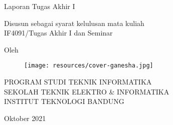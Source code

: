 \clearpage
\pagestyle{empty}

\begin{center}
    \smallskip
    
    \Large \bfseries \MakeUppercase{\thetitle}
    \vfill
    
    \Large Laporan Tugas Akhir I
    \vfill
    
    \large Disusun sebagai syarat kelulusan mata kuliah \\
    IF4091/Tugas Akhir I dan Seminar
    \vfill
    
    \large Oleh
    
    \Large \theauthor
    
    \vfill
    \begin{figure}[h]
        \centering
        \texttt{[image: resources/cover-ganesha.jpg]}
    \end{figure}
    \vfill
    
    \large
    \uppercase{
        Program Studi Teknik Informatika \\
        Sekolah Teknik Elektro \& Informatika \\
        Institut Teknologi Bandung
    }
    
    Oktober 2021
    
\end{center}

\clearpage
